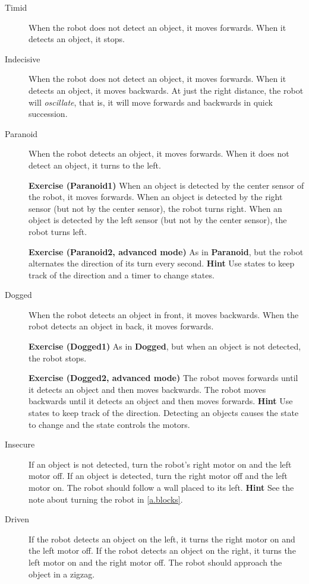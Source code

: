 \begin{description}

\item[Timid] When the robot does not detect an object, it moves forwards.
When it detects an object, it stops.

\item[Indecisive] When the robot does not detect an object, it moves
forwards. When it detects an object, it moves backwards. At just the
right distance, the robot will \emph{oscillate}, that is, it will move
forwards and backwards in quick succession.

\item[Paranoid] When the robot detects an object, it moves forwards. When
it does not detect an object, it turns to the left.

\textbf{Exercise (Paranoid1)} When an object is detected by the center
sensor of the robot, it moves forwards. When an object is detected by
the right sensor (but not by the center sensor), the robot turns right.
When an object is detected by the left sensor (but not by the center
sensor), the robot turns left.

\textbf{Exercise (Paranoid2, advanced mode)} As in \textbf{Paranoid}, but the
robot alternates the direction of its turn every second. \textbf{Hint}
Use states to keep track of the direction and a timer to change states.

\item[Dogged] When the robot detects an object in front, it moves
backwards. When the robot detects an object in back, it moves forwards.

\textbf{Exercise (Dogged1)} As in \textbf{Dogged}, but when an
object is not detected, the robot stops.

\textbf{Exercise (Dogged2, advanced mode)} The robot moves forwards until it
detects an object and then moves backwards. The robot moves backwards
until it detects an object and then moves forwards. \textbf{Hint} Use
states to keep track of the direction. Detecting an objects causes the
state to change and the state controls the motors.

\item[Insecure] If an object is not detected, turn the robot's right
motor on and the left motor off. If an object is detected, turn the
right motor off and the left motor on. The robot should follow a wall
placed to its left. \textbf{Hint} See the note about turning the robot in \cref{a.blocks}.

\item[Driven] If the robot detects an object on the left, it turns the
right motor on and the left motor off. If the robot detects an object on
the right, it turns the left motor on and the right motor off. The robot
should approach the object in a zigzag.


\end{description}
